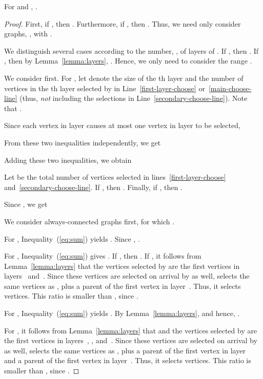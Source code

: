\begin{theorem}
\label{thm:upperdscds}
For \ds and \cds,
.
\end{theorem}
\begin{proof}
First, if , then .
Furthermore, if , then .
Thus, we need only consider graphs, , with .

We distinguish several cases according to the 
number, , of layers of .
If , then .
If , then by Lemma~\ref{lemma:layers}, .
Hence, we only need to consider the range .


We consider \ds first.
For , let  denote the size of the th layer
and  the number of vertices in the th layer
selected by  in Line~\ref{first-layer-choose}
or~\ref{main-choose-line}
(thus, \emph{not} including the selections in Line~\ref{secondary-choose-line}).
Note that .

Since each vertex in layer  causes
at most one vertex in layer  to be selected,

From these two inequalities independently, we get

Adding these two inequalities, we obtain


Let  be the total number of vertices selected in
lines~\ref{first-layer-choose} and~\ref{secondary-choose-line}.
If , then .
Finally, if , then .

Since , we get


We consider always-connected graphs first, for which . 

For , Inequality~(\ref{eq:sum}) yields .
Since , . 

For ,
 Inequality~(\ref{eq:sum}) gives
. 
If , then
.
If , it follows from Lemma~\ref{lemma:layers} that the
vertices selected by \onopt are the first vertices
in layers~ and~.
Since these vertices are selected on arrival 
by \alayersparent as well, 
\alayersparent selects the same vertices as \onopt, plus
a parent of the first vertex in layer~.
Thus, it selects  vertices.
This ratio is smaller than , since .

For , Inequality~(\ref{eq:sum}) yields 
. 
By Lemma~\ref{lemma:layers},  and hence,
. 

For , it follows from Lemma~\ref{lemma:layers} that  and the vertices selected by \onopt are the first vertices in
layers~, , and~.
Since these vertices are selected on arrival
by \alayersparent as well, 
\alayersparent selects the same vertices as \onopt, plus
a parent of the first vertex in layer~ and a parent of the first
vertex in layer~.
Thus, it selects  vertices.
This ratio is smaller than , since .


\end{proof}
